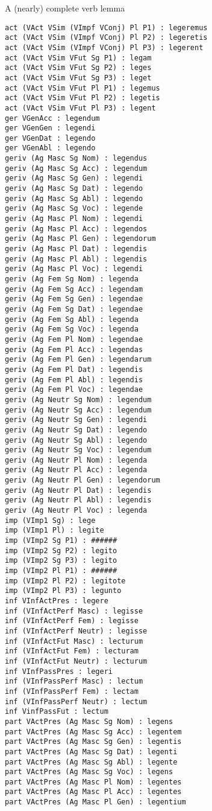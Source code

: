 \documentclass{beamer}
\begin{document}
\begin{frame}[fragile]{A (nearly) complete verb lemma}
\begin{example}
\begin{multicols}{5}
{\begin{Verbatim}
act (VAct VSim (VImpf VConj) Pl P1) : legeremus
act (VAct VSim (VImpf VConj) Pl P2) : legeretis
act (VAct VSim (VImpf VConj) Pl P3) : legerent
act (VAct VSim VFut Sg P1) : legam
act (VAct VSim VFut Sg P2) : leges
act (VAct VSim VFut Sg P3) : leget
act (VAct VSim VFut Pl P1) : legemus
act (VAct VSim VFut Pl P2) : legetis
act (VAct VSim VFut Pl P3) : legent
ger VGenAcc : legendum
ger VGenGen : legendi
ger VGenDat : legendo
ger VGenAbl : legendo
geriv (Ag Masc Sg Nom) : legendus
geriv (Ag Masc Sg Acc) : legendum
geriv (Ag Masc Sg Gen) : legendi
geriv (Ag Masc Sg Dat) : legendo
geriv (Ag Masc Sg Abl) : legendo
geriv (Ag Masc Sg Voc) : legende
geriv (Ag Masc Pl Nom) : legendi
geriv (Ag Masc Pl Acc) : legendos
geriv (Ag Masc Pl Gen) : legendorum
geriv (Ag Masc Pl Dat) : legendis
geriv (Ag Masc Pl Abl) : legendis
geriv (Ag Masc Pl Voc) : legendi
geriv (Ag Fem Sg Nom) : legenda
geriv (Ag Fem Sg Acc) : legendam
geriv (Ag Fem Sg Gen) : legendae
geriv (Ag Fem Sg Dat) : legendae
geriv (Ag Fem Sg Abl) : legenda
geriv (Ag Fem Sg Voc) : legenda
geriv (Ag Fem Pl Nom) : legendae
geriv (Ag Fem Pl Acc) : legendas
geriv (Ag Fem Pl Gen) : legendarum
geriv (Ag Fem Pl Dat) : legendis
geriv (Ag Fem Pl Abl) : legendis
geriv (Ag Fem Pl Voc) : legendae
geriv (Ag Neutr Sg Nom) : legendum
geriv (Ag Neutr Sg Acc) : legendum
geriv (Ag Neutr Sg Gen) : legendi
geriv (Ag Neutr Sg Dat) : legendo
geriv (Ag Neutr Sg Abl) : legendo
geriv (Ag Neutr Sg Voc) : legendum
geriv (Ag Neutr Pl Nom) : legenda
geriv (Ag Neutr Pl Acc) : legenda
geriv (Ag Neutr Pl Gen) : legendorum
geriv (Ag Neutr Pl Dat) : legendis
geriv (Ag Neutr Pl Abl) : legendis
geriv (Ag Neutr Pl Voc) : legenda
imp (VImp1 Sg) : lege
imp (VImp1 Pl) : legite
imp (VImp2 Sg P1) : ######
imp (VImp2 Sg P2) : legito
imp (VImp2 Sg P3) : legito
imp (VImp2 Pl P1) : ######
imp (VImp2 Pl P2) : legitote
imp (VImp2 Pl P3) : legunto
inf VInfActPres : legere
inf (VInfActPerf Masc) : legisse
inf (VInfActPerf Fem) : legisse
inf (VInfActPerf Neutr) : legisse
inf (VInfActFut Masc) : lecturum
inf (VInfActFut Fem) : lecturam
inf (VInfActFut Neutr) : lecturum
inf VInfPassPres : legeri
inf (VInfPassPerf Masc) : lectum
inf (VInfPassPerf Fem) : lectam
inf (VInfPassPerf Neutr) : lectum
inf VinfPassFut : lectum
part VActPres (Ag Masc Sg Nom) : legens
part VActPres (Ag Masc Sg Acc) : legentem
part VActPres (Ag Masc Sg Gen) : legentis
part VActPres (Ag Masc Sg Dat) : legenti
part VActPres (Ag Masc Sg Abl) : legente
part VActPres (Ag Masc Sg Voc) : legens
part VActPres (Ag Masc Pl Nom) : legentes
part VActPres (Ag Masc Pl Acc) : legentes
part VActPres (Ag Masc Pl Gen) : legentium

\end{Verbatim}}
\end{multicols}
\end{example}
\end{frame}
\end{document}
